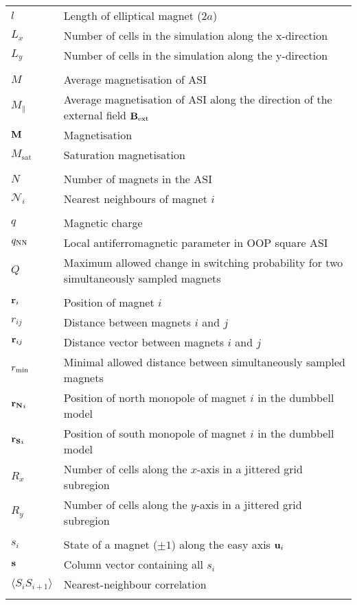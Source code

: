 \begin{longtable}[l]{p{60pt} p{350pt}}
	$l$ & Length of elliptical magnet ($2a$) \\
	$L_x$ & Number of cells in the simulation along the x-direction \\
	$L_y$ & Number of cells in the simulation along the y-direction \\
	&\\

	$M$ & Average magnetisation of ASI \\
	$M_\parallel$ & Average magnetisation of ASI along the direction of the external field $\boldsymbol{\mathbf{B}}_\mathrm{ext}$ \\
	$\boldsymbol{\mathbf{M}}$ & Magnetisation \\
	$M_\mathrm{sat}$ & Saturation magnetisation \\
	&\\

	$N$ & Number of magnets in the ASI \\ %
	$\mathcal{N}_i$ & Nearest neighbours of magnet $i$ \\
	&\\

	$q$ & Magnetic charge \\
	$q_\mathrm{NN}$ & Local antiferromagnetic parameter in OOP square ASI \\
	$Q$ & Maximum allowed change in switching probability for two simultaneously sampled magnets \\
	&\\

	$\boldsymbol{\mathbf{r}}_i$ & Position of magnet $i$ \\
	$r_{ij}$ & Distance between magnets $i$ and $j$ \\
	$\boldsymbol{\mathbf{r}}_{ij}$ & Distance vector between magnets $i$ and $j$ \\
	$r_\mathrm{min}$ & Minimal allowed distance between simultaneously sampled magnets \\
	$\boldsymbol{\mathbf{r_N}}_i$ & Position of north monopole of magnet $i$ in the dumbbell model \\
	$\boldsymbol{\mathbf{r_S}}_i$ & Position of south monopole of magnet $i$ in the dumbbell model \\
	$R_x$ & Number of cells along the $x$-axis in a jittered grid subregion \\
	$R_y$ & Number of cells along the $y$-axis in a jittered grid subregion \\
	&\\

	$s_i$ & State of a magnet ($\pm 1$) along the easy axis $\boldsymbol{\mathbf{u}}_i$ \\
	$\boldsymbol{\mathbf{s}}$ & Column vector containing all $s_i$ \\
	$\langle S_i S_{i+1} \rangle$ & Nearest-neighbour correlation \\
	&\\


\end{longtable}
